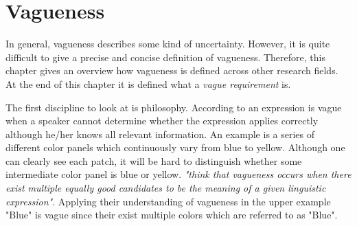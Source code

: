 \section{Vagueness}
\label{chp:fundamentals:sec:vagueness}
In general, vagueness describes some kind of uncertainty.
However, it is quite difficult to give a precise and concise definition of vagueness.
Therefore, this chapter gives an overview how vagueness is defined across other research fields.
At the end of this chapter it is defined what a \textit{vague requirement} is.

The first discipline to look at is philosophy.
According to \textcite{Braun:2007} an expression is vague when a speaker cannot determine whether the expression applies correctly although he/her knows all relevant information.
An example is a series of different color panels which continuously vary from blue to yellow.
Although one can clearly see each patch, it will be hard to distinguish whether some intermediate color panel is blue or yellow.
\textcite{Braun:2007} \textit{"think that vagueness occurs when there exist multiple equally good candidates to be the meaning of a given linguistic expression"}.
Applying their understanding of vagueness in the upper example "Blue" is vague since their exist multiple colors which are referred to as "Blue".
